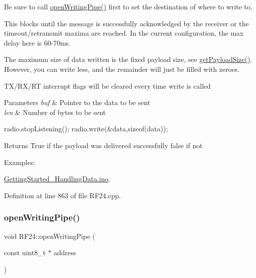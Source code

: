 Be sure to call \hyperlink{classRF24_af2e409e62d49a23e372a70b904ae30e1}{open\+Writing\+Pipe()} first to set the destination of where to write to.

This blocks until the message is successfully acknowledged by the receiver or the timeout/retransmit maxima are reached. In the current configuration, the max delay here is 60-\/70ms.

The maximum size of data written is the fixed payload size, see \hyperlink{classRF24_a0aa0c7cbe3d38fef4722f3f1d2d6c5f1}{get\+Payload\+Size()}. However, you can write less, and the remainder will just be filled with zeroes.

T\+X/\+R\+X/\+RT interrupt flags will be cleared every time write is called


\begin{DoxyParams}{Parameters}
{\em buf} & Pointer to the data to be sent \\
\hline
{\em len} & Number of bytes to be sent\\
\hline
\end{DoxyParams}

\begin{DoxyCode}
radio.stopListening();
radio.write(&data,\textcolor{keyword}{sizeof}(data));
\end{DoxyCode}
 \begin{DoxyReturn}{Returns}
True if the payload was delivered successfully false if not 
\end{DoxyReturn}
\begin{Desc}
\item[Examples\+: ]\par
\hyperlink{GettingStarted_HandlingData_8ino-example}{Getting\+Started\+\_\+\+Handling\+Data.\+ino}.\end{Desc}


Definition at line 863 of file R\+F24.\+cpp.

\mbox{\label{classRF24_af2e409e62d49a23e372a70b904ae30e1}} 
\subsubsection{\texorpdfstring{open\+Writing\+Pipe()}{openWritingPipe()}\hspace{0.1cm}{\footnotesize\ttfamily [1/2]}}
{\footnotesize\ttfamily void R\+F24\+::open\+Writing\+Pipe (\begin{DoxyParamCaption}\item[{const uint8\+\_\+t $\ast$}]{address }\end{DoxyParamCaption})}

